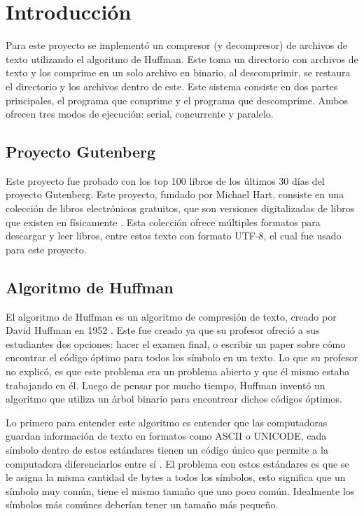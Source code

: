 \documentclass{report}
\begin{document}


\tableofcontents


\chapter{Introducción}\label{intro}

Para este proyecto se implementó un compresor (y decompresor) de archivos de texto utilizando el algoritmo de Huffman.
Este toma un directorio con archivos de texto y los comprime en un solo archivo en binario, al descomprimir, se restaura el directorio y los archivos dentro de este.
Este sistema consiste en dos partes principales,  el programa que comprime y el programa que descomprime.
Ambos ofrecen tres modos de ejecución: serial, concurrente y paralelo.

\section {Proyecto Gutenberg}

Este proyecto fue probado con los top 100 libros de los últimos 30 días del proyecto Gutenberg.
Este proyecto, fundado por Michael  Hart, consiste en una colección de libros electrónicos gratuitos, que son versiones digitalizadas de libros que existen en físicamente \cite{ref0}.
Esta colección ofrece múltiples formatos para descargar y leer libros, entre estos texto con formato UTF-8, el cual fue usado para este proyecto.

\section{Algoritmo de Huffman}

El algoritmo de Huffman es un algoritmo de compresión de texto, creado por David Huffman en 1952 \cite{ref2}.
Este fue creado ya que su profesor ofreció a sus estudiantes dos opciones: hacer el examen final, o escribir un paper sobre cómo encontrar el código óptimo para todos los símbolo en un texto.
Lo que su profesor no explicó,  es que este problema era un problema abierto y que él mismo estaba trabajando en él.
Luego de pensar por mucho tiempo,  Huffman inventó un algoritmo que utiliza un árbol binario para encontrear dichos códigos óptimos. 


Lo primero para entender este algoritmo es entender que las computadoras guardan información de texto en formatos como ASCII o UNICODE, cada símbolo dentro de estos estándares tienen un código único que permite a la computadora diferenciarlos entre sí \cite{ref3}.
El problema con estos estándares es que se le asigna la misma cantidad de bytes a todos los símbolos,  esto significa que un símbolo muy común, tiene el mismo tamaño que uno poco común.
Idealmente los símbolos más comúnes deberían tener un tamaño más pequeño. 
\end{document}
